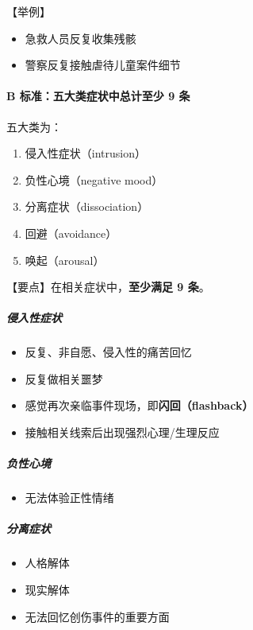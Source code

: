 \documentclass[
  chinese,
  9pt,
  a4paper,
]{ctexart}
\providecommand{\tightlist}{%
  \setlength{\itemsep}{0pt}\setlength{\parskip}{0pt}}
\begin{document}
【举例】

\begin{itemize}
\tightlist
\item
  急救人员反复收集残骸
\item
  警察反复接触虐待儿童案件细节
\end{itemize}

\paragraph{B 标准：五大类症状中总计至少 9
条}\label{b-ux6807ux51c6ux4e94ux5927ux7c7bux75c7ux72b6ux4e2dux603bux8ba1ux81f3ux5c11-9-ux6761}

五大类为：

\begin{enumerate}
\def\labelenumi{\arabic{enumi}.}
\tightlist
\item
  侵入性症状（intrusion）
\item
  负性心境（negative mood）
\item
  分离症状（dissociation）
\item
  回避（avoidance）
\item
  唤起（arousal）
\end{enumerate}

【要点】在相关症状中，\textbf{至少满足 9 条}。

\subparagraph{侵入性症状}\label{ux4fb5ux5165ux6027ux75c7ux72b6}

\begin{itemize}
\tightlist
\item
  反复、非自愿、侵入性的痛苦回忆
\item
  反复做相关噩梦
\item
  感觉再次亲临事件现场，即\textbf{闪回（flashback）}
\item
  接触相关线索后出现强烈心理/生理反应
\end{itemize}

\subparagraph{负性心境}\label{ux8d1fux6027ux5fc3ux5883}

\begin{itemize}
\tightlist
\item
  无法体验正性情绪
\end{itemize}

\subparagraph{分离症状}\label{ux5206ux79bbux75c7ux72b6}

\begin{itemize}
\tightlist
\item
  人格解体
\item
  现实解体
\item
  无法回忆创伤事件的重要方面
\end{itemize}
\end{document}
